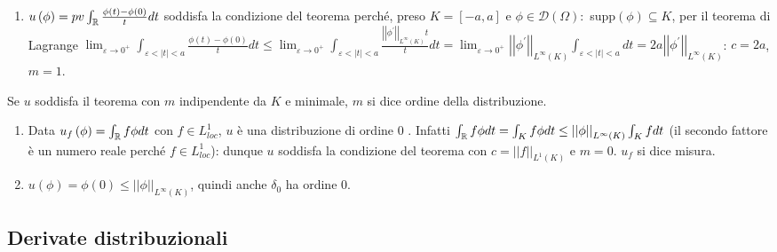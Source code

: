 \documentclass{article}
\begin{document}
\begin{enumerate}
\item $u\left( \phi \right) =pv\int_{%
\mathbb{R}
}\frac{\phi \left( t\right) -\phi \left( 0\right) }{t}dt$ soddisfa la
condizione del teorema perch\'{e}, preso $K=\left[ -a,a\right] $ e $\phi \in 
\mathcal{D}\left( \Omega \right) :$ supp$\left( \phi \right) \subseteq K$,
per il teorema di Lagrange $\lim_{\varepsilon \rightarrow
0^{+}}\int_{\varepsilon <\left\vert t\right\vert <a}\frac{\phi \left(
t\right) -\phi \left( 0\right) }{t}dt\leq \lim_{\varepsilon \rightarrow
0^{+}}\int_{\varepsilon <\left\vert t\right\vert <a}\frac{\left\vert
\left\vert \phi ^{\prime }\right\vert \right\vert _{L^{\infty }\left(
K\right) }t}{t}dt=\lim_{\varepsilon \rightarrow 0^{+}}\left\vert \left\vert
\phi ^{\prime }\right\vert \right\vert _{L^{\infty }\left( K\right)
}\int_{\varepsilon <\left\vert t\right\vert <a}dt=2a\left\vert \left\vert
\phi ^{\prime }\right\vert \right\vert _{L^{\infty }\left( K\right) }$: $%
c=2a $, $m=1$.
\end{enumerate}

Se $u$ soddisfa il teorema con $m$ indipendente da $K$ e minimale, $m$ si
dice ordine della distribuzione.

\begin{enumerate}
\item Data $u_{f}\left( \phi \right) =\int_{%
\mathbb{R}
}f\phi dt$ con $f\in L_{loc}^{1}$, $u$ \`{e} una distribuzione di ordine $0$%
. Infatti $\int_{%
\mathbb{R}
}f\phi dt=\int_{K}f\phi dt\leq \left\vert \left\vert \phi \right\vert
\right\vert _{L^{\infty }\left( K\right) }\int_{K}fdt$ (il secondo fattore 
\`{e} un numero reale perch\'{e} $f\in L_{loc}^{1}$): dunque $u$ soddisfa la
condizione del teorema con $c=\left\vert \left\vert f\right\vert \right\vert
_{L^{1}\left( K\right) }$ e $m=0$. $u_{f}$ si dice misura.

\item $u\left( \phi \right) =\phi \left( 0\right) \leq \left\vert \left\vert
\phi \right\vert \right\vert _{L^{\infty }\left( K\right) }$, quindi anche $%
\delta _{0}$ ha ordine $0$.
\end{enumerate}

\subsection{Derivate distribuzionali}
\end{document}
